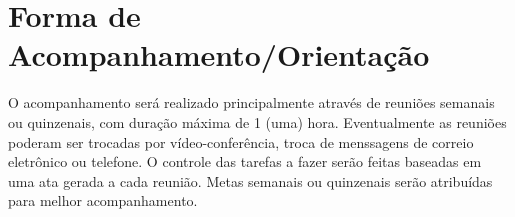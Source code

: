\section{Forma de Acompanhamento/Orientação}

O acompanhamento será realizado principalmente através de reuniões semanais ou quinzenais, com duração máxima de 1 (uma) hora. Eventualmente as reuniões poderam ser trocadas por vídeo-conferência, troca de menssagens de correio eletrônico ou telefone. O controle das tarefas a fazer serão feitas baseadas em uma ata gerada a cada reunião. Metas semanais ou quinzenais serão atribuídas para melhor acompanhamento.
